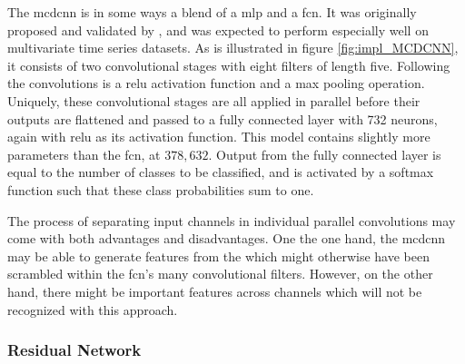 The \acrfull{mcdcnn} is in some ways a blend of a \acrshort{mlp} and a \acrshort{fcn}. It was originally proposed and validated by \textcite{zheng2014}, and was expected to perform especially well on multivariate time series datasets. As is illustrated in figure \ref{fig:impl_MCDCNN}, it consists of two convolutional stages with eight filters of length five. Following the convolutions is a \acrshort{relu} activation function and a max pooling operation. Uniquely, these convolutional stages are all applied in parallel before their outputs are flattened and passed to a fully connected layer with 732 neurons, again with \acrshort{relu} as its activation function. This model contains slightly more parameters than the \acrshort{fcn}, at $378,632$. Output from the fully connected layer is equal to the number of classes to be classified, and is activated by a softmax function such that these class probabilities sum to one.

The process of separating input channels in individual parallel convolutions may come with both advantages and disadvantages. One the one hand, the \acrshort{mcdcnn} may be able to generate features from the which might otherwise have been scrambled within the \acrshort{fcn}'s many convolutional filters. However, on the other hand, there might be important features across channels which will not be recognized with this approach. 

\newpage
\subsubsection{Residual Network}

